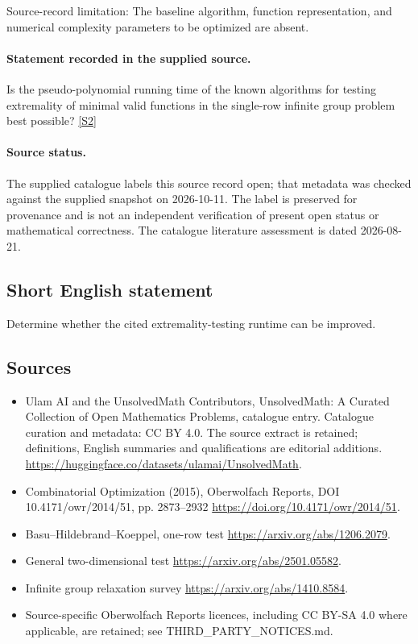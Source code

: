 \documentclass[11pt]{article}
\begin{document}
Source-record limitation: The baseline algorithm, function representation, and numerical complexity parameters to be optimized are absent.
\paragraph{Statement recorded in the supplied source.}
Is the pseudo-polynomial running time of the known algorithms for testing extremality of minimal valid functions in the single-row infinite group problem best possible? \href{https://doi.org/10.4171/owr/2014/51}{[S2]}
\paragraph{Source status.}
The supplied catalogue labels this source record open; that metadata was checked against the supplied snapshot on 2026-10-11. The label is preserved for provenance and is not an independent verification of present open status or mathematical correctness. The catalogue literature assessment is dated 2026-08-21.
\subsection{Short English statement}
Determine whether the cited extremality-testing runtime can be improved.
\subsection{Sources}
\begin{itemize}
\item[S1] Ulam AI and the UnsolvedMath Contributors, UnsolvedMath: A Curated Collection of Open Mathematics Problems, catalogue entry. Catalogue curation and metadata: CC BY 4.0. The source extract is retained; definitions, English summaries and qualifications are editorial additions.
\url{https://huggingface.co/datasets/ulamai/UnsolvedMath}.
\item[S2] Combinatorial Optimization (2015), Oberwolfach Reports, DOI 10.4171/owr/2014/51, pp. 2873--2932
\url{https://doi.org/10.4171/owr/2014/51}.
\item[S3] Basu--Hildebrand--Koeppel, one-row test
\url{https://arxiv.org/abs/1206.2079}.
\item[S4] General two-dimensional test
\url{https://arxiv.org/abs/2501.05582}.
\item[S5] Infinite group relaxation survey
\url{https://arxiv.org/abs/1410.8584}.
\item Source-specific Oberwolfach Reports licences, including CC BY-SA 4.0 where applicable, are retained; see THIRD\_PARTY\_NOTICES.md.
\end{itemize}
\end{document}
